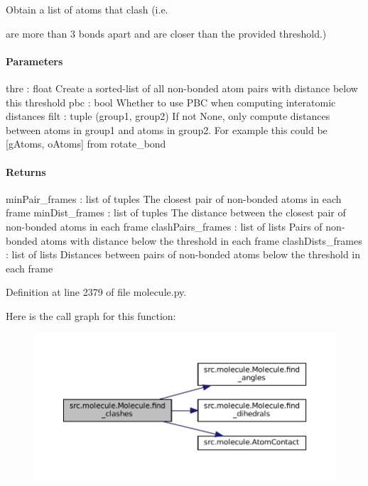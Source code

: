Obtain a list of atoms that \textquotesingle{}clash\textquotesingle{} (i.\+e. 

are more than 3 bonds apart and are closer than the provided threshold.)

\paragraph*{Parameters }

thre \+: float Create a sorted-\/list of all non-\/bonded atom pairs with distance below this threshold pbc \+: bool Whether to use P\+BC when computing interatomic distances filt \+: tuple (group1, group2) If not None, only compute distances between atoms in \textquotesingle{}group1\textquotesingle{} and atoms in \textquotesingle{}group2\textquotesingle{}. For example this could be \mbox{[}g\+Atoms, o\+Atoms\mbox{]} from rotate\+\_\+bond

\paragraph*{Returns }

min\+Pair\+\_\+frames \+: list of tuples The closest pair of non-\/bonded atoms in each frame min\+Dist\+\_\+frames \+: list of tuples The distance between the closest pair of non-\/bonded atoms in each frame clash\+Pairs\+\_\+frames \+: list of lists Pairs of non-\/bonded atoms with distance below the threshold in each frame clash\+Dists\+\_\+frames \+: list of lists Distances between pairs of non-\/bonded atoms below the threshold in each frame 

Definition at line 2379 of file molecule.\+py.

Here is the call graph for this function\+:
\nopagebreak
\begin{figure}[H]
\begin{center}
\leavevmode
\includegraphics[width=350pt]{classsrc_1_1molecule_1_1Molecule_a201a811c87574b4e229880540e4e6ef9_cgraph}
\end{center}
\end{figure}
\mbox{\label{classsrc_1_1molecule_1_1Molecule_ac07431c9d938d6f0e24e71beef9119c5}} 
